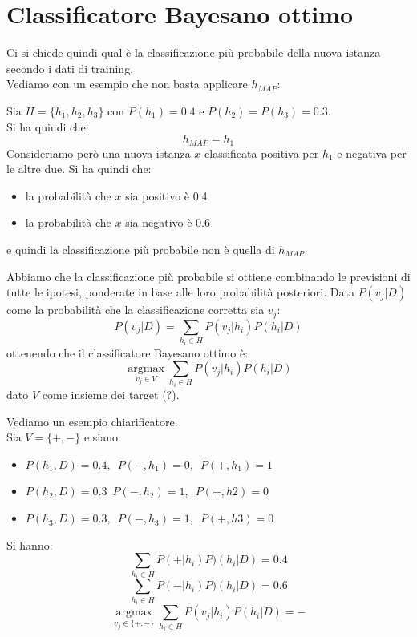 \section{Classificatore Bayesano ottimo}
Ci si chiede quindi qual è la classificazione più probabile della nuova istanza
secondo i dati di training.\\
Vediamo con un esempio che non basta applicare $h_{MAP}$:
\begin{esempio}
  Sia $H=\{h_1, h_2, h_3\}$ con $P(h_1)=0.4$ e $P(h_2)=P(h_3)=0.3$.\\
  Si ha quindi che:
  \[h_{MAP}=h_1\]
  Consideriamo però una nuova istanza $x$ classificata positiva per $h_1$ e
  negativa per le altre due. Si ha quindi che:
  \begin{itemize}
    \item la probabilità che $x$ sia positivo è 0.4
    \item la probabilità che $x$ sia negativo è 0.6
  \end{itemize}
  e quindi la classificazione più probabile non è quella di $h_{MAP}$.
\end{esempio}
Abbiamo che la classificazione più probabile si ottiene combinando le previsioni
di tutte le ipotesi, ponderate in base alle loro probabilità posteriori. Data
$P(v_j|D)$ come la probabilità che la classificazione corretta sia $v_j$:
\[P(v_j|D)=\sum_{h_i\in H}P(v_j|h_i)P(h_i|D)\]
ottenendo che il classificatore Bayesano ottimo è:
\[\operatorname*{argmax}_{v_j\in V}\sum_{h_i\in H}P(v_j|h_i)P(h_i|D)\]
dato $V$ come insieme dei target (?).
\begin{esempio}
  Vediamo un esempio chiarificatore.\\
  Sia $V=\{+,-\}$ e siano:
  \begin{itemize}
    \item $P(h_1, D) =0.4,\,\,\, P(-, h_1) = 0,\,\,\, P(+, h_1) = 1$
    \item $P(h_2, D) =0.3\,\,\, P(-, h_2) = 1,\,\,\, P(+, h2) = 0$
    \item $P(h_3, D) =0.3,\,\,\, P(-, h_3) = 1,\,\,\, P(+, h3) = 0$
  \end{itemize}
  Si hanno:
  \[\sum_{h_i\in H}P(+|h_i)P)(h_i|D)=0.4\]
  \[\sum_{h_i\in H}P(-|h_i)P)(h_i|D)=0.6\]
  \[\operatorname*{argmax}_{v_j\in \{+,-\}}\sum_{h_i\in H}P(v_j|h_i)P(h_i|D)=-\]
\end{esempio}
